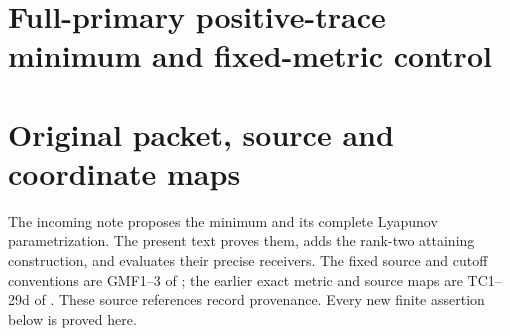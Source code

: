 \endgroup

\clearpage
\begingroup
\def\C{\mathbb C}
\def\R{\mathbb R}
\def\PP{\mathcal P}
\def\norm#1{\left\lVert#1\right\rVert}
\def\Tr{\operatorname{Tr}}
\def\rank{\operatorname{rank}}
\def\im{\operatorname{im}}
\def\diag{\operatorname{diag}}
\def\spec{\operatorname{spec}}

\setcounter{equation}{0}
\renewcommand{\theequation}{A03PT.\arabic{equation}}
\section*{Full-primary positive-trace minimum and fixed-metric control}



\begin{abstract}
For the unchanged arithmetic multiplication packet, the minimum of the
positive Hermitian weight trace over all positive metrics is evaluated,
attained, and its entire minimizing set is parametrized by finite
Lyapunov sums. All primary jets and all same-half cross terms are
retained. A rank-one observable forcing on each complete spectral half
constructs an attaining metric whose weight has precisely two nonzero
eigenvalues. The canonical attained polynomial metric is then evaluated
through its actual boundary rows: its exact rank-two scalar exceeds the
minimum by an explicit positive spectral-projection expression. The
positive-primary determinant line has exactly the same growth exponent
for every metric. Finally an original finite polynomial section realizes
every minimizing metric up to a specified scalar, and its complete
residual in each smaller polynomial source quotient is computed.
\end{abstract}

\section{Original packet, source and coordinate maps}

The incoming note \cite{a03pt:incoming} proposes the minimum and its complete
Lyapunov parametrization. The present text proves them, adds the
rank-two attaining construction, and evaluates their precise receivers.
The fixed source and cutoff conventions are GMF1--3 of
\cite{a03pt:gmf}; the earlier exact metric and source maps are TC1--29d of
\cite{a03pt:tc}. These source references record provenance. Every new finite
assertion below is proved here.

